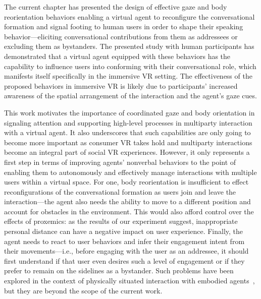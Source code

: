 The current chapter has presented the design of effective gaze and body reorientation behaviors enabling a virtual agent to reconfigure the conversational formation and signal footing to human users in order to shape their speaking behavior---eliciting conversational contributions from them as addressees or excluding them as bystanders. The presented study with human participants has demonstrated that a virtual agent equipped with these behaviors has the capability to influence users into conforming with their conversational role, which manifests itself specifically in the immersive VR setting. The effectiveness of the proposed behaviors in immersive VR is likely due to participants' increased awareness of the spatial arrangement of the interaction and the agent's gaze cues.

This work motivates the importance of coordinated gaze and body orientation in signaling attention and supporting high-level processes in multiparty interaction with a virtual agent. It also underscores that such capabilities are only going to become more important as consumer VR takes hold and multiparty interactions become an integral part of social VR experiences. However, it only represents a first step in terms of improving agents' nonverbal behaviors to the point of enabling them to autonomously and effectively manage interactions with multiple users within a virtual space. For one, body reorientation is insufficient to effect reconfigurations of the conversational formation as users join and leave the interaction---the agent also needs the ability to move to a different position and account for obstacles in the environment. This would also afford control over the effects of proxemics: as the results of our experiment suggest, inappropriate personal distance can have a negative impact on user experience. Finally, the agent needs to react to user behaviors and infer their engagement intent from their movements---i.e., before engaging with the user as an addressee, it should first understand if that user even desires such a level of engagement or if they prefer to remain on the sidelines as a bystander. Such problems have been explored in the context of physically situated interaction with embodied agents~\citep{bohus2009models}, but they are beyond the scope of the current work.